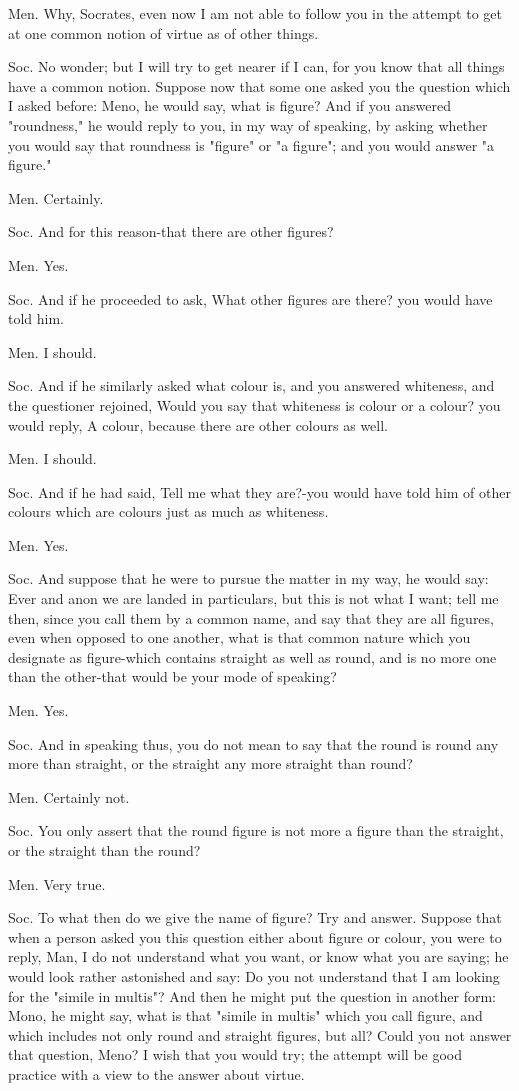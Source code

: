 Men. Why, Socrates, even now I am not able to follow you in the attempt
to get at one common notion of virtue as of other things.

Soc. No wonder; but I will try to get nearer if I can, for you know
that all things have a common notion. Suppose now that some one asked
you the question which I asked before: Meno, he would say, what is
figure? And if you answered "roundness," he would reply to you, in
my way of speaking, by asking whether you would say that roundness
is "figure" or "a figure"; and you would answer "a figure."

Men. Certainly. 

Soc. And for this reason-that there are other figures? 

Men. Yes. 

Soc. And if he proceeded to ask, What other figures are there? you
would have told him. 

Men. I should. 

Soc. And if he similarly asked what colour is, and you answered whiteness,
and the questioner rejoined, Would you say that whiteness is colour
or a colour? you would reply, A colour, because there are other colours
as well. 

Men. I should. 

Soc. And if he had said, Tell me what they are?-you would have told
him of other colours which are colours just as much as whiteness.

Men. Yes. 

Soc. And suppose that he were to pursue the matter in my way, he would
say: Ever and anon we are landed in particulars, but this is not what
I want; tell me then, since you call them by a common name, and say
that they are all figures, even when opposed to one another, what
is that common nature which you designate as figure-which contains
straight as well as round, and is no more one than the other-that
would be your mode of speaking? 

Men. Yes. 

Soc. And in speaking thus, you do not mean to say that the round is
round any more than straight, or the straight any more straight than
round? 

Men. Certainly not. 

Soc. You only assert that the round figure is not more a figure than
the straight, or the straight than the round? 

Men. Very true. 

Soc. To what then do we give the name of figure? Try and answer. Suppose
that when a person asked you this question either about figure or
colour, you were to reply, Man, I do not understand what you want,
or know what you are saying; he would look rather astonished and say:
Do you not understand that I am looking for the "simile in multis"?
And then he might put the question in another form: Mono, he might
say, what is that "simile in multis" which you call figure, and which
includes not only round and straight figures, but all? Could you not
answer that question, Meno? I wish that you would try; the attempt
will be good practice with a view to the answer about virtue.

